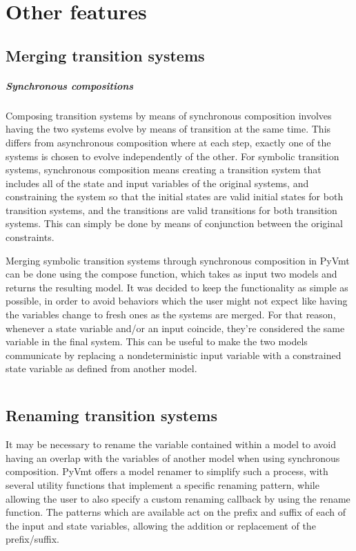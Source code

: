 \chapter{Other features}

\section{Merging transition systems}
\paragraph*{Synchronous compositions}
Composing transition systems by means of synchronous composition involves having the two systems evolve by means of transition at the same time.
This differs from asynchronous composition where at each step, exactly one of the systems is chosen to evolve independently of the other.
For symbolic transition systems, synchronous composition means creating a transition system that includes all of the state and input variables of the original systems, and constraining the system so that the initial states are valid initial states for both transition systems, and the transitions are valid transitions for both transition systems.
This can simply be done by means of conjunction between the original constraints.

Merging symbolic transition systems through synchronous composition in PyVmt can be done using the compose function, which takes as input two models and returns the resulting model.
It was decided to keep the functionality as simple as possible, in order to avoid behaviors which the user might not expect like having the variables change to fresh ones as the systems are merged.
For that reason, whenever a state variable and/or an input coincide, they're considered the same variable in the final system.
This can be useful to make the two models communicate by replacing a nondeterministic input variable with a constrained state variable as defined from another model.

\inputminted[firstline=9, lastline=33]{python3}{py/composition.py}

\section{Renaming transition systems}
It may be necessary to rename the variable contained within a model to avoid having an overlap with the variables of another model when using synchronous composition.
PyVmt offers a model renamer to simplify such a process, with several utility functions that implement a specific renaming pattern, while allowing the user to also specify a custom renaming callback by using the rename function.
The patterns which are available act on the prefix and suffix of each of the input and state variables, allowing the addition or replacement of the prefix/suffix.

\inputminted[firstline=9, lastline=41]{python3}{py/renaming.py}

